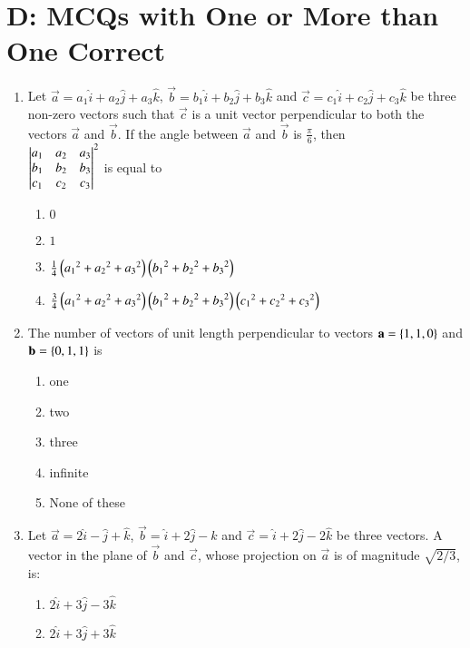 \documentclass[journal,12pt,twocolumn]{IEEEtran}
\theoremstyle{remark}
\begin{document}
 \section{D: MCQs with One or More than One Correct}
\begin{enumerate}
	\item %
		Let $\vec{a}=a_1\hat{i}+a_2\hat{j}+a_3\hat{k}$, $\vec{b}=b_1\hat{i}+b_2\hat{j}+b_3\hat{k}$ and $\vec{c}=c_1\hat{i}+c_2\hat{j}+c_3\hat{k}$ be three non-zero vectors such that $\vec{c}$ is a unit vector perpendicular to both the vectors $\vec{a}$ and $\vec{b}$. If the angle between $\vec{a}$ and $\vec{b}$ is $\frac{\pi}{6}$, then \\
$
	\begin{vmatrix}
a_1 & a_2 & a_3 \\
b_1 & b_2 & b_3 \\
c_1 & c_2 & c_3
\end{vmatrix}^2
$
		is equal to \hfill{}\\
		\begin{enumerate}
			\item $0$
			\item $1$
			\item $\frac{1}{4}\left({a_1}^2+{a_2}^2+{a_3}^2\right)\left({b_1}^2+{b_2}^2+{b_3}^2\right)$
			\item $\frac{3}{4}\left({a_1}^2+{a_2}^2+{a_3}^2\right)\left({b_1}^2+{b_2}^2+{b_3}^2\right)\left({c_1}^2+{c_2}^2+{c_3}^2\right)$
		\end{enumerate}
\item %
	The number of vectors of unit length perpendicular to vectors $\mathbf{a}=\left\{1,1,0\right\}$ and $\mathbf{b}=\left\{0,1,1\right\}$ is \hfill{}\\
		\begin{enumerate}
			\item one
		        \item two
			\item three
			\item infinite
			\item None of these
		\end{enumerate}
\item %
	Let $\vec{a}=2\hat{i}-\hat{j}+\hat{k}$, $\vec{b}=\hat{i}+2\hat{j}-\hat{k}$ and $\vec{c}=\hat{i}+2\hat{j}-2\hat{k}$ be three vectors. A vector in the plane of $\vec{b}$ and $\vec{c}$, whose projection on $\vec{a}$ is of magnitude $\sqrt{2/3}$, is: \hfill{}\\
		\begin{enumerate}
			\item $2\hat{i}+3\hat{j}-3\hat{k}$
			\item $2\hat{i}+3\hat{j}+3\hat{k}$

\end{enumerate}
\end{enumerate}
\end{document}
